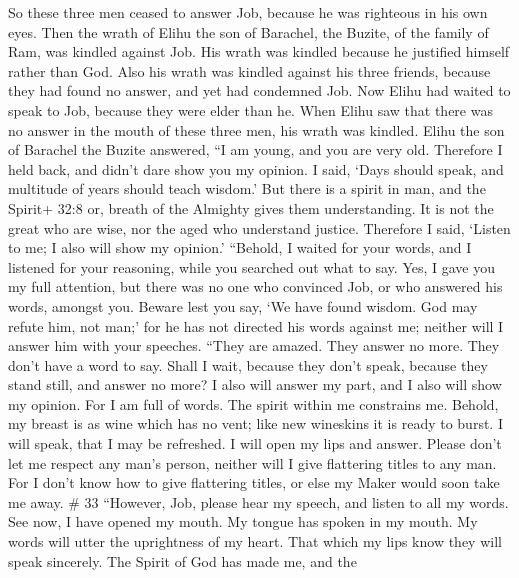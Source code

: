  So these three men ceased to answer Job, because he was
righteous in his own eyes.  Then the wrath of Elihu the son
of Barachel, the Buzite, of the family of Ram, was kindled against Job.
His wrath was kindled because he justified himself rather than God.
 Also his wrath was kindled against his three friends,
because they had found no answer, and yet had condemned Job.
 Now Elihu had waited to speak to Job, because they were
elder than he.  When Elihu saw that there was no answer in
the mouth of these three men, his wrath was kindled.  Elihu
the son of Barachel the Buzite answered, ``I am young, and you are very
old. Therefore I held back, and didn't dare show you my opinion.
 I said, `Days should speak, and multitude of years should
teach wisdom.'  But there is a spirit in man, and the
Spirit+ 32:8 or, breath of the Almighty gives them understanding.
 It is not the great who are wise, nor the aged who
understand justice.  Therefore I said, `Listen to me; I
also will show my opinion.'  ``Behold, I waited for your
words, and I listened for your reasoning, while you searched out what to
say.  Yes, I gave you my full attention, but there was no
one who convinced Job, or who answered his words, amongst you.
 Beware lest you say, `We have found wisdom. God may refute
him, not man;'  for he has not directed his words against
me; neither will I answer him with your speeches.  ``They
are amazed. They answer no more. They don't have a word to say.
 Shall I wait, because they don't speak, because they stand
still, and answer no more?  I also will answer my part, and
I also will show my opinion.  For I am full of words. The
spirit within me constrains me.  Behold, my breast is as
wine which has no vent; like new wineskins it is ready to burst.
 I will speak, that I may be refreshed. I will open my lips
and answer.  Please don't let me respect any man's person,
neither will I give flattering titles to any man.  For I
don't know how to give flattering titles, or else my Maker would soon
take me away. \# 33  ``However, Job, please hear my speech,
and listen to all my words.  See now, I have opened my
mouth. My tongue has spoken in my mouth.  My words will
utter the uprightness of my heart. That which my lips know they will
speak sincerely.  The Spirit of God has made me, and the
